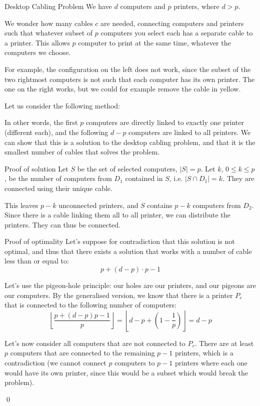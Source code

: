\documentclass[a4paper]{article}
\begin{document}
\begin{parag}{Desktop Cabling Problem}
    We have $d$ computers and $p$ printers, where $d > p$.

    We wonder how many cables $c$ are needed, connecting computers and printers such that whatever subset of $p$ computers you select each has a separate cable to a printer. This allows $p$ computer to print at the same time, whatever the computers we choose.


    For example, the configuration on the left does not work, since the subset of the two rightmost computers is not such that each computer has its own printer. The one on the right works, but we could for example remove the cable in yellow.

    Let us consider the following method:

    In other words, the first $p$ computers are directly linked to exactly one printer (different each), and the following $d - p$ computers are linked to all printers. We can show that this is a solution to the desktop cabling problem, and that it is the smallest number of cables that solves the problem.

    \begin{subparag}{Proof of solution}
        Let $S$ be the set of selected computers, $\left|S\right| =  p$. Let $k$, $0 \leq k \leq p$, be the number of computers from $D_1$ contained in $S$, i.e. $\left|S \cap D_1\right| = k$. They are connected using their unique cable.

        This leaves $p - k$ unconnected printers, and $S$ contains $p - k$ computers from $D_2$. Since there is a cable linking them all to all printer, we can distribute the printers. They can thus be connected.
    \end{subparag}

    \begin{subparag}{Proof of optimality}
        Let's suppose for contradiction that this solution is not optimal, and thus that there exists a solution that works with a number of cable less than or equal to:
        \[p + \left(d - p\right)\cdot p - 1\]

        Let's use the pigeon-hole principle: our holes are our printers, and our pigeons are our computers. By the generalised version, we know that there is a printer $P_r$ that is connected to the following number of computers:
        \[\left\lfloor \frac{p + \left(d - p\right)p - 1}{p} \right\rfloor = \left\lfloor d - p + \left(1 - \frac{1}{p}\right) \right\rfloor = d - p\]
        
        Let's now consider all computers that are not connected to $P_r$. There are at least $p$ computers that are connected to the remaining $p - 1$ printers, which is a contradiction (we cannot connect $p$ computers to $p-1$ printers where each one would have its own printer, since this would be a subset which would break the problem).

        \qed
    \end{subparag}
\end{parag}
\end{document}
